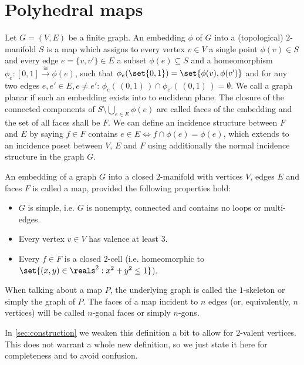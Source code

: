 \section{Polyhedral maps}\label{sec:polymap}
\begin{definition}
  Let $G = (V, E)$ be a finite graph. An embedding $\phi$ of $G$ into a (topological) $2$-manifold $S$ is a map which assigns to every vertex $v \in V$ a single point $\phi(v) \in S$ and every edge $e = \{v, v'\} \in E$ a subset $\phi(e) \subseteq S$ and a homeomorphism $\phi_e : [0, 1] \stackrel{\cong}{\longrightarrow} \phi(e)$, such that $\phi_e(\set{0, 1}) = \set{\phi(v), \phi(v')}$ and for any two edges $e, e' \in E, e \neq e'$: $\phi_e(\,(0,1)\,) \cap \phi_{e'}(\,(0,1)\,) = \emptyset$. We call a graph planar if such an embedding exists into to euclidean plane. The closure of the connected components of $S \setminus \bigcup_{e \in E} \phi(e)$ are called faces of the embedding and the set of all faces shall be $F$. We can define an incidence structure between $F$ and $E$ by saying $f \in F$ contains $e \in E \iff f \cap \phi(e) = \phi(e)$, which extends to an incidence poset between $V$, $E$ and $F$ using additionally the normal incidence structure in the graph $G$.
\end{definition}

\begin{definition} \label{def:map} An embedding of a graph $G$ into a closed $2$-manifold with vertices $V$, edges $E$ and faces $F$ is called a map, provided the following properties hold:
  \begin{itemize}
  \item $G$ is simple, i.e. $G$ is nonempty, connected and contains no loops or multi-edges.
  \item Every vertex $v \in V$ has valence at least $3$.
  \item Every $f \in F$ is a closed $2$-cell (i.e. homeomorphic to $\set{(x, y) \in \reals^2 : x^2 + y^2 \leq 1}$).
  \end{itemize}
  When talking about a map $P$, the underlying graph is called the $1$-skeleton or simply the graph of $P$. The faces of a map incident to $n$ edges (or, equivalently, $n$ vertices) will be called $n$-gonal faces or simply $n$-gons.
\end{definition}

\begin{remark}
  In \autoref{sec:construction} we weaken this definition a bit to allow for $2$-valent vertices. This does not warrant a whole new definition, so we just state it here for completeness and to avoid confusion.
\end{remark}

